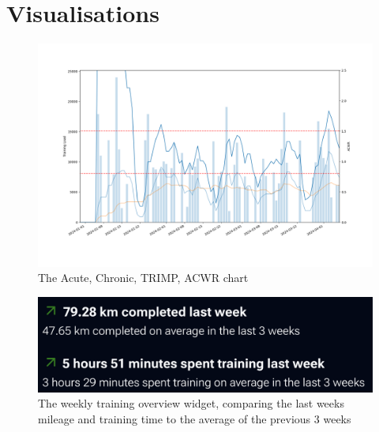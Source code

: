 \section{Visualisations}
\begin{figure}[!hp]
  \centering
  \includegraphics[width=\linewidth]{figures/acwr.png}
  \captionsetup{justification=centering}
  \caption*{\label{fig:app_acwr}The Acute, Chronic, TRIMP, ACWR chart}
\end{figure}
\begin{figure}[!hp]
  \centering
  \includegraphics[width=\linewidth]{figures/trainingOverviewWidget.png}
  \captionsetup{justification=centering}
  \caption*{\label{fig:app_weeklyTrainingOverview}The weekly training overview widget, comparing the last weeks mileage and training time to the average of the previous 3 weeks} 
\end{figure}
